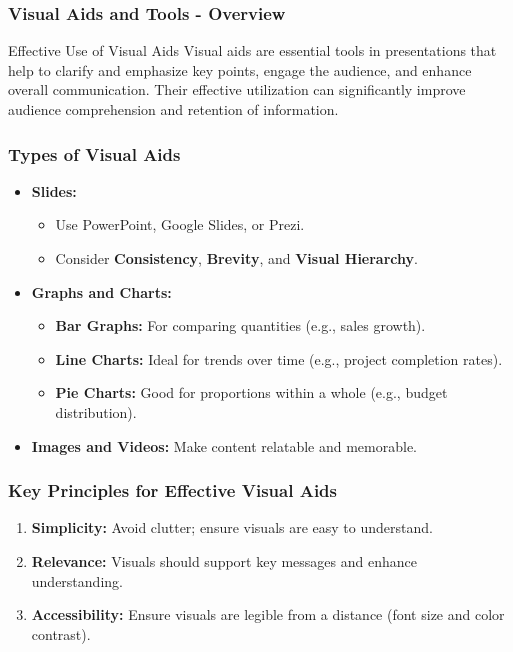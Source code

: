 \documentclass[aspectratio=169]{beamer}
\begin{document}
\begin{frame}[fragile]
    \frametitle{Visual Aids and Tools - Overview}
    \begin{block}{Effective Use of Visual Aids}
        Visual aids are essential tools in presentations that help to clarify and emphasize key points, engage the audience, and enhance overall communication. Their effective utilization can significantly improve audience comprehension and retention of information.
    \end{block}
\end{frame}

\begin{frame}[fragile]
    \frametitle{Types of Visual Aids}
    \begin{itemize}
        \item \textbf{Slides:} 
        \begin{itemize}
            \item Use PowerPoint, Google Slides, or Prezi.
            \item Consider \textbf{Consistency}, \textbf{Brevity}, and \textbf{Visual Hierarchy}.
        \end{itemize}
        
        \item \textbf{Graphs and Charts:}
        \begin{itemize}
            \item \textbf{Bar Graphs:} For comparing quantities (e.g., sales growth).
            \item \textbf{Line Charts:} Ideal for trends over time (e.g., project completion rates).
            \item \textbf{Pie Charts:} Good for proportions within a whole (e.g., budget distribution).
        \end{itemize}
        
        \item \textbf{Images and Videos:} Make content relatable and memorable.
    \end{itemize}
\end{frame}

\begin{frame}[fragile]
    \frametitle{Key Principles for Effective Visual Aids}
    \begin{enumerate}
        \item \textbf{Simplicity:} Avoid clutter; ensure visuals are easy to understand.
        \item \textbf{Relevance:} Visuals should support key messages and enhance understanding.
        \item \textbf{Accessibility:} Ensure visuals are legible from a distance (font size and color contrast).
    \end{enumerate}
\end{frame}
\end{document}
